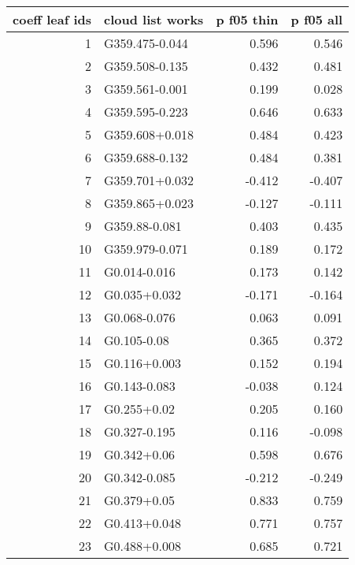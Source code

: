 \begin{tabular}{rlrr}
\toprule
 coeff leaf ids & cloud list works &  p f05 thin &  p f05 all \\
\midrule
              1 &   G359.475-0.044 &       0.596 &      0.546 \\
              2 &   G359.508-0.135 &       0.432 &      0.481 \\
              3 &   G359.561-0.001 &       0.199 &      0.028 \\
              4 &   G359.595-0.223 &       0.646 &      0.633 \\
              5 &   G359.608+0.018 &       0.484 &      0.423 \\
              6 &   G359.688-0.132 &       0.484 &      0.381 \\
              7 &   G359.701+0.032 &      -0.412 &     -0.407 \\
              8 &   G359.865+0.023 &      -0.127 &     -0.111 \\
              9 &    G359.88-0.081 &       0.403 &      0.435 \\
             10 &   G359.979-0.071 &       0.189 &      0.172 \\
             11 &     G0.014-0.016 &       0.173 &      0.142 \\
             12 &     G0.035+0.032 &      -0.171 &     -0.164 \\
             13 &     G0.068-0.076 &       0.063 &      0.091 \\
             14 &      G0.105-0.08 &       0.365 &      0.372 \\
             15 &     G0.116+0.003 &       0.152 &      0.194 \\
             16 &     G0.143-0.083 &      -0.038 &      0.124 \\
             17 &      G0.255+0.02 &       0.205 &      0.160 \\
             18 &     G0.327-0.195 &       0.116 &     -0.098 \\
             19 &      G0.342+0.06 &       0.598 &      0.676 \\
             20 &     G0.342-0.085 &      -0.212 &     -0.249 \\
             21 &      G0.379+0.05 &       0.833 &      0.759 \\
             22 &     G0.413+0.048 &       0.771 &      0.757 \\
             23 &     G0.488+0.008 &       0.685 &      0.721 \\

\end{tabular}
